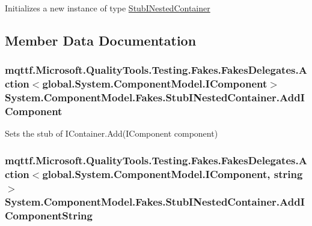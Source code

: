 Initializes a new instance of type \hyperlink{class_system_1_1_component_model_1_1_fakes_1_1_stub_i_nested_container}{Stub\-I\-Nested\-Container}



\subsection{Member Data Documentation}
\hypertarget{class_system_1_1_component_model_1_1_fakes_1_1_stub_i_nested_container_ad0eff77c53001d2d637fd154b12b66e8}{
\subsubsection[{Add\-I\-Component}]{\setlength{\rightskip}{0pt plus 5cm}mqttf.\-Microsoft.\-Quality\-Tools.\-Testing.\-Fakes.\-Fakes\-Delegates.\-Action$<$global.\-System.\-Component\-Model.\-I\-Component$>$ System.\-Component\-Model.\-Fakes.\-Stub\-I\-Nested\-Container.\-Add\-I\-Component}}\label{class_system_1_1_component_model_1_1_fakes_1_1_stub_i_nested_container_ad0eff77c53001d2d637fd154b12b66e8}


Sets the stub of I\-Container.\-Add(\-I\-Component component)

\hypertarget{class_system_1_1_component_model_1_1_fakes_1_1_stub_i_nested_container_a276c61c6e1b9ea759f43daaefcc9c452}{
\subsubsection[{Add\-I\-Component\-String}]{\setlength{\rightskip}{0pt plus 5cm}mqttf.\-Microsoft.\-Quality\-Tools.\-Testing.\-Fakes.\-Fakes\-Delegates.\-Action$<$global.\-System.\-Component\-Model.\-I\-Component, string$>$ System.\-Component\-Model.\-Fakes.\-Stub\-I\-Nested\-Container.\-Add\-I\-Component\-String}}\label{class_system_1_1_component_model_1_1_fakes_1_1_stub_i_nested_container_a276c61c6e1b9ea759f43daaefcc9c452}


